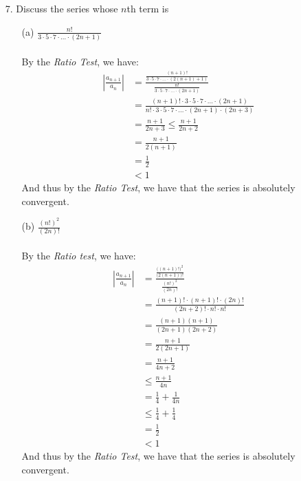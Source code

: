 \documentclass[12pt,letterpaper]{article}
\newcommand{\abs}[1]{\left\lvert #1 \right\rvert}
\theoremstyle{case}
\theoremstyle{definition}
\begin{document}
\begin{enumerate}
\begin{enumerate}
			\item[7.] Discuss the series whose $n$th term is
			\begin{enumerate}
				\item[(a)] $\displaystyle\frac{n!}{3\cdot5\cdot7\cdot\dots\cdot(2n+1)}$
				\\\\By the \textit{Ratio Test}, we have:
				\begin{align*}
					\abs{\frac{a_{n+1}}{a_n}} &= \frac{\displaystyle\frac{(n+1)!}{3 \cdot 5 \cdot 7 \cdot \dots \cdot (2(n+1)+1)}}{\displaystyle\frac{n!}{3 \cdot 5 \cdot 7 \cdot \dots \cdot (2n+1)}} \\
					&= \frac{(n+1)!\cdot 3 \cdot 5 \cdot 7 \cdot \dots \cdot (2n+1)}{n! \cdot 3 \cdot 5 \cdot 7 \cdot \dots \cdot (2n+1)\cdot(2n+3)} \\
					&= \frac{n+1}{2n+3} \leq \frac{n+1}{2n+2} \\
					&= \frac{n+1}{2(n+1)} \\
					&= \frac{1}{2} \\
					&< 1
				\end{align*}
				And thus by the \textit{Ratio Test}, we have that the series is absolutely convergent.\\
				
				\item[(b)] $\displaystyle\frac{(n!)^2}{(2n)!}$
				\\\\By the \textit{Ratio test}, we have:
				\begin{align*}
					\abs{\frac{a_{n+1}}{a_n}} &= \frac{\displaystyle\frac{\big((n+1)!\big)^2}{\big(2(n+1)\big)!}}{\displaystyle\frac{(n!)^2}{(2n)!}} \\
					&= \frac{(n+1)! \cdot (n+1)! \cdot (2n)!}{(2n+2)!\cdot n! \cdot n!} \\
					&= \frac{(n+1)(n+1)}{(2n+1)(2n+2)} \\
					&= \frac{n+1}{2(2n+1)} \\
					&= \frac{n+1}{4n+2} \\
					&\leq \frac{n+1}{4n} \\
					&= \frac{1}{4} + \frac{1}{4n} \\
					&\leq \frac{1}{4}+\frac{1}{4} \\
					&= \frac{1}{2} \\
					&< 1
				\end{align*}
				And thus by the \textit{Ratio Test}, we have that the series is absolutely convergent.\\
				

\end{enumerate}
\end{enumerate}
\end{enumerate}
\end{document}
